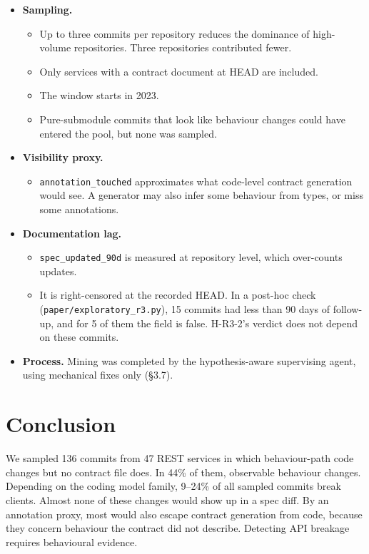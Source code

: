 \documentclass[conference]{IEEEtran}
\begin{document}
\begin{itemize}
\begin{itemize}
\end{itemize}
\item \textbf{Sampling.}
\begin{itemize}
\item Up to three commits per repository reduces the dominance of high-volume repositories. Three repositories contributed fewer.
\item Only services with a contract document at HEAD are included.
\item The window starts in 2023.
\item Pure-submodule commits that look like behaviour changes could have entered the pool, but none was sampled.
\end{itemize}
\item \textbf{Visibility proxy.}
\begin{itemize}
\item \texttt{annotation\_touched} approximates what code-level contract generation would see. A generator may also infer some behaviour from types, or miss some annotations.
\end{itemize}
\item \textbf{Documentation lag.}
\begin{itemize}
\item \texttt{spec\_updated\_90d} is measured at repository level, which over-counts updates.
\item It is right-censored at the recorded HEAD. In a post-hoc check (\texttt{paper/\allowbreak{}exploratory\_r3.py}), 15 commits had less than 90 days of follow-up, and for 5 of them the field is false. H-R3-2's verdict does not depend on these commits.
\end{itemize}
\item \textbf{Process.} Mining was completed by the hypothesis-aware supervising agent, using mechanical fixes only (\S{}3.7).
\end{itemize}

\section{Conclusion}
We sampled 136 commits from 47 REST services in which behaviour-path code changes but no contract file does. In 44\% of them, observable behaviour changes. Depending on the coding model family, 9--24\% of all sampled commits break clients. Almost none of these changes would show up in a spec diff. By an annotation proxy, most would also escape contract generation from code, because they concern behaviour the contract did not describe. Detecting API breakage requires behavioural evidence.
\end{document}
